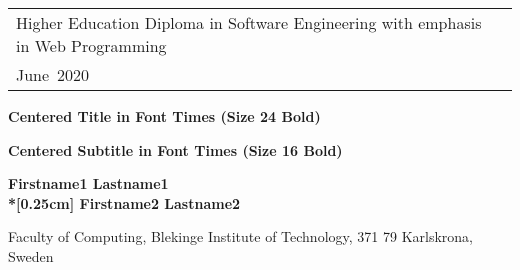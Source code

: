 \documentclass[a4paper,twoside]{bth}
\newcommand{\thesisDegree}{Higher Education Diploma in Software Engineering with emphasis in Web Programming}
\newcommand{\thesisMonth}{June}
\newcommand{\thesisYear}{2020}
\newcommand{\faculty}{Computing}
\newcommand{\thesisTitle}{Centered Title in Font Times (Size 24 Bold)}
\newcommand{\thesisSubtitle}{Centered Subtitle in Font Times (Size 16 Bold)}
\newcommand{\authorFirst}{Firstname1 Lastname1}
\newcommand{\authorSecond}{Firstname2 Lastname2}
\begin{document}
\pagestyle{plain}

{\pagestyle{empty}
\changepage{3cm}{1cm}{-0.5cm}{-0.5cm}{}{-1.5cm}{}{}{}
\noindent
\begin{tabular}{@{}p{} p{}}
\thesisDegree & \hfill\multirow{3}{*}{\bthcsnotextlogo{3cm}} \\
\thesisMonth \ \thesisYear & \\
\end{tabular}

\center

\vspace {7.5cm}

{\Huge\textbf{\thesisTitle}}

\vspace {0.5cm}

{\Large\textbf{\thesisSubtitle}}

\vspace {2cm}

{\Large\textbf{\authorFirst \\*[0.25cm] \authorSecond}}

\vspace*{\fill}

\noindent\makebox[\linewidth]{\rule{\textwidth}{1pt}}
Faculty of \faculty, Blekinge Institute of Technology, 371 79 Karlskrona, Sweden

\clearpage
} %
\end{document}
